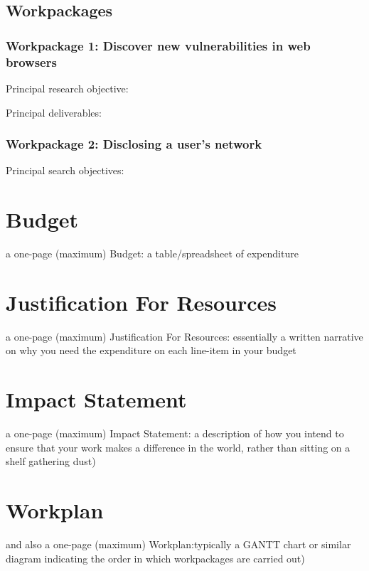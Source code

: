 \documentclass[a4paper,11pt]{article}
\begin{document}
\subsection*{Workpackages}
\subsubsection*{Workpackage 1: Discover new vulnerabilities in web browsers}
Principal research objective:

Principal deliverables:

\subsubsection*{Workpackage 2: Disclosing a user's network}
Principal search objectives:













\newpage
\section*{Budget}

a one-page (maximum) Budget: a table/spreadsheet of expenditure

\newpage
\section*{Justification For Resources}

a one-page (maximum) Justification For Resources: essentially a written narrative on why you need the expenditure on each line-item in your budget

\newpage
\section*{Impact Statement}

a one-page (maximum) Impact Statement: a description of how you intend to ensure that your work makes a difference in the world, rather than sitting on a shelf gathering dust)

\newpage
\section*{Workplan}

and also a one-page (maximum) Workplan:typically a GANTT chart or similar diagram indicating the order in which workpackages are carried out)
\end{document}
